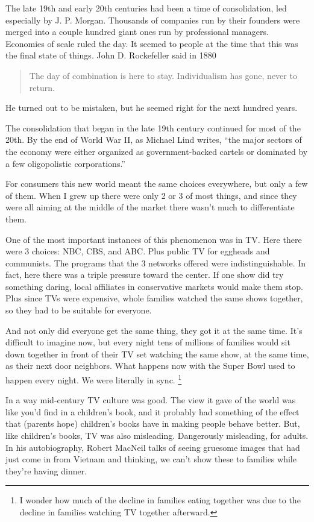 \documentclass[12pt]{book}
\begin{document}
The late 19th and early 20th centuries had been a time of consolidation,
led especially by J. P. Morgan. Thousands of companies run by their
founders were merged into a couple hundred giant ones run by
professional managers. Economies of scale ruled the day. It seemed to
people at the time that this was the final state of things. John D.
Rockefeller said in 1880

\begin{quote}
The day of combination is here to stay. Individualism has gone, never to
return.
\end{quote}

He turned out to be mistaken, but he seemed right for the next hundred
years.

The consolidation that began in the late 19th century continued for most
of the 20th. By the end of World War II, as Michael Lind writes, ``the
major sectors of the economy were either organized as government-backed
cartels or dominated by a few oligopolistic corporations.''

For consumers this new world meant the same choices everywhere, but only
a few of them. When I grew up there were only 2 or 3 of most things, and
since they were all aiming at the middle of the market there wasn't much
to differentiate them.

One of the most important instances of this phenomenon was in TV. Here
there were 3 choices: NBC, CBS, and ABC. Plus public TV for eggheads and
communists. The programs that the 3 networks offered were
indistinguishable. In fact, here there was a triple pressure toward the
center. If one show did try something daring, local affiliates in
conservative markets would make them stop. Plus since TVs were
expensive, whole families watched the same shows together, so they had
to be suitable for everyone.

And not only did everyone get the same thing, they got it at the same
time. It's difficult to imagine now, but every night tens of millions of
families would sit down together in front of their TV set watching the
same show, at the same time, as their next door neighbors. What happens
now with the Super Bowl used to happen every night. We were literally in
sync. \footnote{I wonder how much of the decline in families eating together was
due to the decline in families watching TV together afterward.}

In a way mid-century TV culture was good. The view it gave of the world
was like you'd find in a children's book, and it probably had something
of the effect that (parents hope) children's books have in making people
behave better. But, like children's books, TV was also misleading.
Dangerously misleading, for adults. In his autobiography, Robert MacNeil
talks of seeing gruesome images that had just come in from Vietnam and
thinking, we can't show these to families while they're having dinner.
\end{document}
